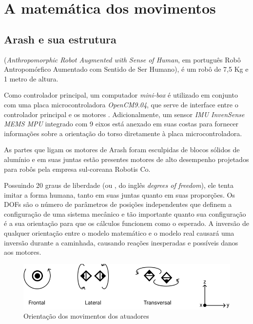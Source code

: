\chapter{A matemática dos movimentos}
\label{ch:Math}

\section{Arash e sua estrutura}

(\textit{Anthropomorphic Robot Augmented with Sense of Human}, em português Robô Antropomórfico Aumentado com Sentido de Ser Humano), é um robô de 7,5 Kg e 1 metro de altura. 

Como controlador principal, um computador \textit{mini-box} é utilizado em conjunto com uma placa microcontroladora \textit{OpenCM9.04}, que serve de interface entre o controlador principal e os motores \cite{autdp2016}. Adicionalmente, um sensor \textit{IMU InvenSense MEMS MPU} integrado com 9 eixos \cite{karimionline} está anexado em suas costas para fornecer informações sobre a orientação do torso diretamente à placa microcontroladora.

As partes que ligam os motores de Arash foram esculpidas de blocos sólidos de alumínio e em suas juntas estão presentes motores de alto desempenho projetados para robôs pela empresa sul-coreana Robotis Co.

Possuindo 20 graus de liberdade (ou , do inglês \textit{degrees of freedom}), ele tenta imitar a forma humana, tanto em suas juntas quanto em suas proporções. Os DOFs são o número de parâmetros de posições independentes que definem a configuração de uma sistema mecânico \cite{craig1989} e tão importante quanto sua configuração é a sua orientação para que os cálculos funcionem como o esperado. A inversão de qualquer orientação entre o modelo matemático e o modelo real causará uma inversão durante a caminhada, causando reações inesperadas e possíveis danos aos motores.

\begin{figure}[htb]
	\centering
	\includegraphics[scale=1]{imagens/svg/actuators-orientation}
	\caption{Orientação dos movimentos dos atuadores}
	\label{fig:ActuatorsOrientation}
\end{figure}

